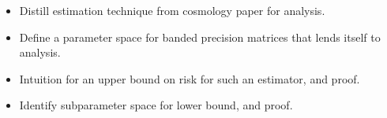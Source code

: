\begin{frame}[fragile] \frametitle{}
    \begin{itemize}
        \item Distill estimation technique from cosmology paper for analysis.
        \item Define a parameter space for banded precision matrices that lends
            itself to analysis.
        \item Intuition for an upper bound on risk for such an estimator,
            and proof.
        \item Identify subparameter space for lower bound, and proof.
    \end{itemize}
\end{frame}

